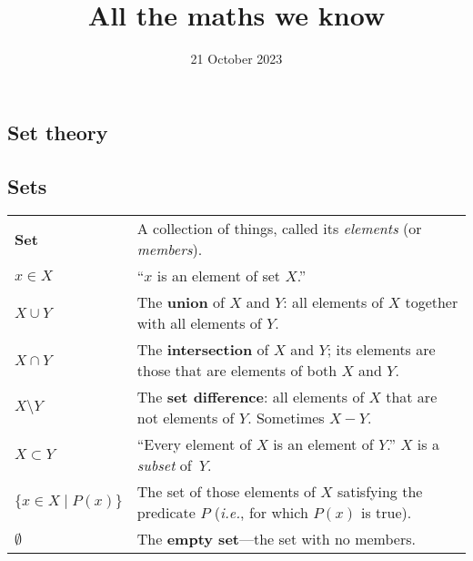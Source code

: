 \documentclass[10pt, a4paper, landscape]{article}
\title{All the maths we know}
\author{}
\date{21 October 2023}
\newcommand{\defn}[1]{\textbf{#1}}
\begin{document}
\begin{multicols*}{3}\raggedcolumns%
\maketitle

\section*{Set theory}
\subsection*{Sets}
\begin{tabularx}{\columnwidth}{@{}l>{\raggedright\arraybackslash}X@{}}
  \toprule
  \defn{Set} & A collection of things, called its \emph{elements} (or \emph{members}). \\

  $x \in X$    & ``$x$ is an element of set $X$.'' \\

  $X\cup Y$     & The \defn{union} of $X$ and $Y$: all elements of $X$ together with all elements of $Y$. \\

  $X\cap Y$     & The \defn{intersection} of $X$ and $Y$; its elements are
  those that are elements of both $X$ and $Y$. \\

  $X \setminus Y$      & The \defn{set difference}: all elements of $X$ that are not elements of $Y$. Sometimes $X-Y$. \\

  $X \subset Y$    & ``Every element of $X$ is an element of $Y$.'' $X$ is a \emph{subset} of~$Y$. \\

  $\{x\in X\mid P(x)\}$ & The set of those elements of $X$ satisfying the
  predicate $P$ (\textit{i.e.}, for which $P(x)$ is true). \\

  $\emptyset$        & The \defn{empty set}---the set with no members. \\

\end{tabularx}



\end{multicols*}
\end{document}
